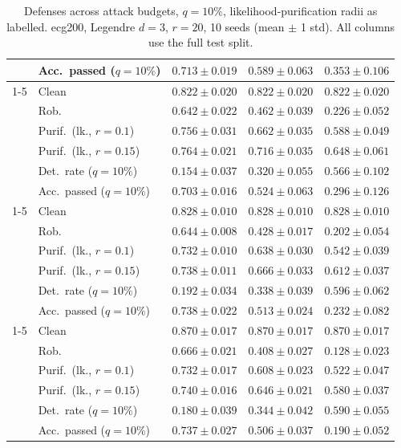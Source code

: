 \begin{table}[htbp]
\begin{tabular}{@{}llrrr@{}}
     & Acc.\ passed ($q{=}10\%$) & $0.713 \pm 0.019$ & $\mathbf{0.589 \pm 0.063}$ & $\mathbf{0.353 \pm 0.106}$ \\
    \cmidrule(lr){1-5}
    \multirow{6}{*}{$\alpha{=}0.2$} & Clean & $0.822 \pm 0.020$ & $0.822 \pm 0.020$ & $0.822 \pm 0.020$ \\
     & Rob. & $0.642 \pm 0.022$ & $0.462 \pm 0.039$ & $0.226 \pm 0.052$ \\
     & Purif.\ (lk., $r{=}0.1$) & $0.756 \pm 0.031$ & $0.662 \pm 0.035$ & $0.588 \pm 0.049$ \\
     & Purif.\ (lk., $r{=}0.15$) & $0.764 \pm 0.021$ & $0.716 \pm 0.035$ & $0.648 \pm 0.061$ \\
     & Det.\ rate ($q{=}10\%$) & $0.154 \pm 0.037$ & $0.320 \pm 0.055$ & $0.566 \pm 0.102$ \\
     & Acc.\ passed ($q{=}10\%$) & $0.703 \pm 0.016$ & $0.524 \pm 0.063$ & $0.296 \pm 0.126$ \\
    \cmidrule(lr){1-5}
    \multirow{6}{*}{$\alpha{=}0.5$} & Clean & $0.828 \pm 0.010$ & $0.828 \pm 0.010$ & $0.828 \pm 0.010$ \\
     & Rob. & $0.644 \pm 0.008$ & $0.428 \pm 0.017$ & $0.202 \pm 0.054$ \\
     & Purif.\ (lk., $r{=}0.1$) & $0.732 \pm 0.010$ & $0.638 \pm 0.030$ & $0.542 \pm 0.039$ \\
     & Purif.\ (lk., $r{=}0.15$) & $0.738 \pm 0.011$ & $0.666 \pm 0.033$ & $0.612 \pm 0.037$ \\
     & Det.\ rate ($q{=}10\%$) & $0.192 \pm 0.034$ & $0.338 \pm 0.039$ & $\mathbf{0.596 \pm 0.062}$ \\
     & Acc.\ passed ($q{=}10\%$) & $\mathbf{0.738 \pm 0.022}$ & $0.513 \pm 0.024$ & $0.232 \pm 0.082$ \\
    \cmidrule(lr){1-5}
    \multirow{6}{*}{$\alpha{=}1$} & Clean & $\mathbf{0.870 \pm 0.017}$ & $\mathbf{0.870 \pm 0.017}$ & $\mathbf{0.870 \pm 0.017}$ \\
     & Rob. & $0.666 \pm 0.021$ & $0.408 \pm 0.027$ & $0.128 \pm 0.023$ \\
     & Purif.\ (lk., $r{=}0.1$) & $0.732 \pm 0.017$ & $0.608 \pm 0.023$ & $0.522 \pm 0.047$ \\
     & Purif.\ (lk., $r{=}0.15$) & $0.740 \pm 0.016$ & $0.646 \pm 0.021$ & $0.580 \pm 0.037$ \\
     & Det.\ rate ($q{=}10\%$) & $0.180 \pm 0.039$ & $\mathbf{0.344 \pm 0.042}$ & $0.590 \pm 0.055$ \\
     & Acc.\ passed ($q{=}10\%$) & $0.737 \pm 0.027$ & $0.506 \pm 0.037$ & $0.190 \pm 0.052$ \\
    \bottomrule
  \end{tabular}
  \caption{Defenses across attack budgets, $q{=}10\%$, likelihood-purification radii as labelled. ecg200, Legendre $d{=}3$, $r{=}20$, 10 seeds (mean $\pm$ 1 std). All columns use the full test split.}
  \label{tab:ecg200_models_r20}
\end{table}
